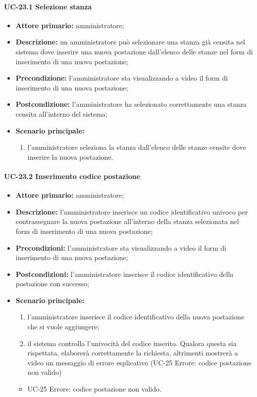 \paragraph{UC-23.1 Selezione stanza}
\begin{itemize}
    \item \textbf{Attore primario:} amministratore;
    \item \textbf{Descrizione:} un amministratore pu\`{o} selezionare una stanza già censita nel sistema dove inserire una nuova postazione dall'elenco delle stanze nel form di inserimento di una nuova postazione;
    \item \textbf{Precondizione:} l'amministratore sta visualizzando a video il form di inserimento di una nuova postazione;
    \item \textbf{Postcondizione:} l'amministratore ha selezionato correttamente una stanza censita all'interno del sistema;
    \item \textbf{Scenario principale:}
    \begin{enumerate}
        \item l'amministratore seleziona la stanza dall'elenco delle stanze censite dove inserire la nuova postazione.
    \end{enumerate}
\end{itemize}


\paragraph{UC-23.2 Inserimento codice postazione}
\begin{itemize}
	\item \textbf{Attore primario:} amministratore;
	\item \textbf{Descrizione:} l'amministratore inserisce un codice identificativo univoco per contrassegnare la nuova postazione all'interno della stanza selezionata nel form di inserimento di una nuova postazione;
	\item \textbf{Precondizioni:} l'amministratore sta visualizzando a video il form di inserimento di una nuova postazione;
	\item \textbf{Postcondizioni:} l'amministratore inserisce il codice identificativo della postazione con successo;
	\item \textbf{Scenario principale:}
	      \begin{enumerate}
		      \item l'amministratore inserisce il codice identificativo della nuova postazione che si vuole aggiungere;
		      \item il sistema controlla l'univocità del codice inserito. Qualora questa sia rispettata, elaborerà correttamente la richiesta, altrimenti mostrerà a video un messaggio di errore esplicativo (UC-25 Errore: codice postazione non valido)
	      \end{enumerate}
          \begin{itemize}
            \item UC-25 Errore: codice postazione non valido.
        \end{itemize}
\end{itemize}
    

